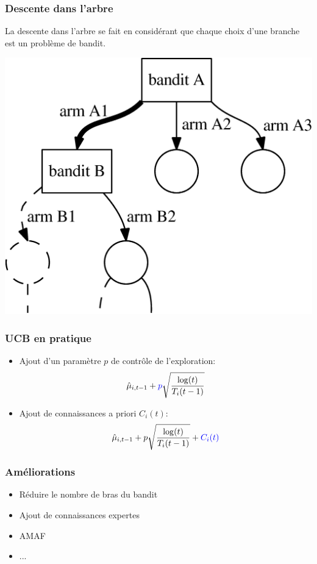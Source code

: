 \documentclass[compress, color = usenames, dvipsnames]{beamer}
\begin{document}
\begin{frame}
    \frametitle{Descente dans l'arbre}
    La descente dans l'arbre se fait en considérant que chaque choix d'une branche est un problème de bandit.

    \begin{center}
        \includegraphics[scale=0.5]{figs/bandit_cascade.png}
    \end{center}


\end{frame}

\begin{frame}
    \frametitle{UCB en pratique}
    \begin{itemize}
        \item Ajout d'un paramètre $p$ de contrôle de l'exploration:
            $$ \hat{\mu}_{i,t-1} + {\color{blue}p} \sqrt{\frac{\log(t)}{T_i(t-1)}} $$
        \item Ajout de connaissances a priori $C_i(t)$:
            $$ \hat{\mu}_{i,t-1} + p \sqrt{\frac{\log(t)}{T_i(t-1)}} + {\color{blue} C_i(t)} $$
    \end{itemize}
    
\end{frame}

\begin{frame}
    \frametitle{Améliorations}
    \begin{itemize}
        \item Réduire le nombre de bras du bandit
        \item Ajout de connaissances expertes 
        \item AMAF
        \item ...
    \end{itemize}
    
\end{frame}
\end{document}
